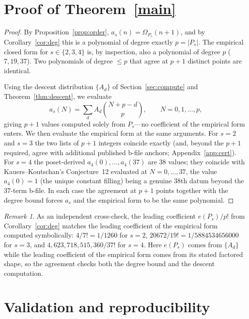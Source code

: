 \documentclass[11pt]{article}
\theoremstyle{plain}
\theoremstyle{definition}
\theoremstyle{remark}
\newtheorem{remark}[theorem]{Remark}
\newcommand{\Om}{\Omega}
\begin{document}
\section{Proof of Theorem~\ref{main}}\label{sec:proof}

\begin{proof}
By Proposition~\ref{prop:order}, $a_s(n)=\Om_{P_s}(n+1)$, and by Corollary~\ref{cor:deg} this is a
polynomial of degree exactly $p=\lvert P_s\rvert$. The empirical closed form for $s\in\{2,3,4\}$ is,
by inspection, also a polynomial of degree $p$ ($7,19,37$). Two polynomials of degree $\le p$ that
agree at $p+1$ distinct points are identical.

Using the descent distribution $\{A_d\}$ of Section~\ref{sec:compute} and Theorem~\ref{thm:descent},
we evaluate
\[
  a_s(N)=\sum_{d} A_d\binom{N+p-d}{p},\qquad N=0,1,\dots,p,
\]
giving $p+1$ values computed solely from $P_s$---no coefficient of the empirical form enters. We then
evaluate the empirical form at the same arguments. For $s=2$ and $s=3$ the two lists of $p+1$
integers coincide exactly (and, beyond the $p+1$ required, agree with additional published b-file
anchors; Appendix~\ref{app:cert}). For $s=4$ the poset-derived $a_4(0),\dots,a_4(37)$ are $38$
values; they coincide with Kauers--Koutschan's Conjecture~12 evaluated at $N=0,\dots,37$, the value
$a_4(0)=1$ (the unique constant filling) being a genuine $38$th datum beyond the $37$-term b-file. In
each case the agreement at $p+1$ points together with the degree bound forces $a_s$ and the empirical
form to be the same polynomial.
\end{proof}

\begin{remark}\label{rem:leadcoef}
As an independent cross-check, the leading coefficient $e(P_s)/p!$ from Corollary~\ref{cor:deg}
matches the leading coefficient of the empirical form computed symbolically: $4/7!=1/1260$ for
$s=2$, $20672/19!=1/5884534656000$ for $s=3$, and $4{,}623{,}718{,}515{,}360/37!$ for $s=4$. Here
$e(P_s)$ comes from $\{A_d\}$ while the leading coefficient of the empirical form comes from its
stated factored shape, so the agreement checks both the degree bound and the descent computation.
\end{remark}

\section{Validation and reproducibility}\label{sec:repro}
\end{document}
